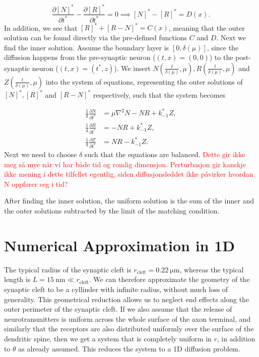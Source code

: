 \documentclass{article}
\begin{document}
\begin{equation}
    \frac{\partial [N]^*}{\partial t^*} - \frac{\partial [R]^*}{\partial t^*} = 0 \implies [N]^* - [R]^* = D(x).
\end{equation}
In addition, we see that $[R]^* + [R-N]^* = C(x)$, meaning that the outer solution can be found directly via the pre-defined functions $C$ and $D$. Next we find the inner solution. Assume the boundary layer is $[0,\delta(\mu)]$, since the diffusion happens from the pre-synaptic neuron ($(t,x) = (0,0)$) to the post-synaptic neuron ($(t,x) = (t^*,z)$). We insert $N(\frac{t}{\delta(\mu)},\mu), R(\frac{t}{\delta(\mu)},\mu)$ and $Z(\frac{t}{\delta(\mu)},\mu)$ into the system of equations, representing the outer solutions of $[N]^*, [R]^*$ and $[R-N]^*$ respectively, such that the system becomes 

\begin{align}
    \frac{1}{\delta}\frac{\partial N}{\partial t^*} &= \mu\nabla^2N- NR + k_{-1}^*Z,\\
    \frac{1}{\delta}\frac{\partial R}{\partial t^*} &= - NR + k_{-1}^*Z  ,\\
    \frac{1}{\delta}\frac{\partial Z}{\partial t^*} &= NR - k_{-1}^*Z.
\end{align}
Next we need to choose $\delta$ such that the equations are balanced. \textcolor{red}{Dette gir ikke meg så mye når vi har både tid og romlig dimensjon. Perturbasjon gir kanskje ikke mening i dette tilfellet egentlig, siden diffusjonsleddet ikke påvirker hvordan N oppfører seg i tid?}

After finding the inner solution, the uniform solution is the sum of the inner and the outer solutions subtracted by the limit of the matching condition. 

\section{Numerical Approximation in 1D}

The typical radius of the synaptic cleft is $r_{\text{cleft}}=\SI{0.22}{\micro \meter}$, whereas the typical length is $L = \SI{15}{\nano \meter} \ll r_{\text{cleft}}$. We can therefore approximate the geometry of the synaptic cleft to be a cyllinder with infinite radius, without much loss of generality. This geometrical reduction allows us to neglect end effects along the outer perimeter of the synaptic cleft. If we also assume that the release of neurotransmitters is uniform across the whole surface of the axon terminal, and similarly that the receptors are also distributed uniformly over the surface of the dendritic spine, then we get a system that is completely uniform in $r$, in addition to $\theta$ as already assumed. This reduces the system to a 1D diffusion problem.
\end{document}
